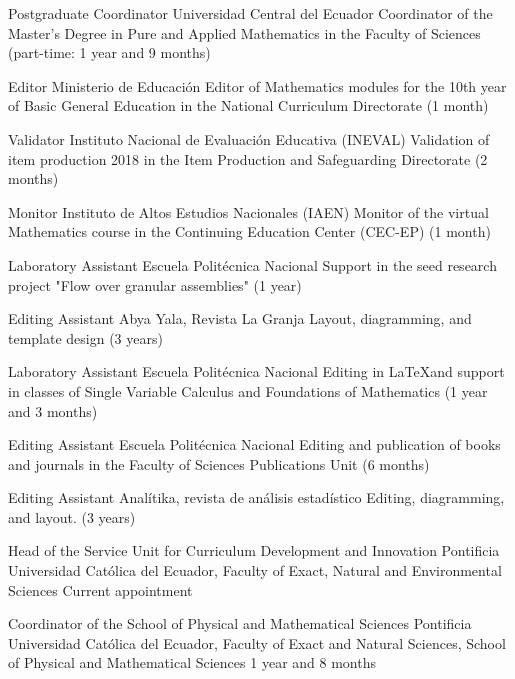 \documentclass[
    a4paper,
    maincolor=cvblue!70!blue,
    sidecolor=gray!30,
    sectioncolor=cvblue!70!blue,
    sidebarwidth=7.5cm,
    topbottommargin=20pt,
    leftrightmargin=20pt,
]{fortysecondscv}
\begin{document}

    {Postgraduate Coordinator}
    {Universidad Central del Ecuador}
    {Coordinator of the Master's Degree in Pure and Applied Mathematics in the Faculty of Sciences (part-time: 1 year and 9 months)}

    {Editor}
    {Ministerio de Educación}
    {Editor of Mathematics modules for the 10th year of Basic General Education in the National Curriculum Directorate (1 month)}

    {Validator}
    {Instituto Nacional de Evaluación Educativa (INEVAL)}
    {Validation of item production 2018 in the Item Production and Safeguarding Directorate (2 months)}

    {Monitor}
    {Instituto de Altos Estudios Nacionales (IAEN)}
    {Monitor of the virtual Mathematics course in the Continuing Education Center (CEC-EP) (1 month)}

    {Laboratory Assistant}
    {Escuela Politécnica Nacional}
    {Support in the seed research project "Flow over granular assemblies" (1 year)}

    {Editing Assistant}
    {Abya Yala, Revista La Granja}
    {Layout, diagramming, and template design (3 years)}

    {Laboratory Assistant}
    {Escuela Politécnica Nacional}
    {Editing in \LaTeX and support in classes of Single Variable Calculus and Foundations of Mathematics (1 year and 3 months)}

    {Editing Assistant}
    {Escuela Politécnica Nacional}
    {Editing and publication of books and journals in the Faculty of Sciences Publications Unit (6 months)}

    {Editing Assistant}
    {Analítika, revista de análisis estadístico}
    {Editing, diagramming, and layout. (3 years)}


\makebacksidebar


    {Head of the Service Unit for Curriculum Development and Innovation}
    {Pontificia Universidad Católica del Ecuador, Faculty of Exact, Natural and Environmental Sciences}
    {Current appointment}

    {Coordinator of the School of Physical and Mathematical Sciences}
    {Pontificia Universidad Católica del Ecuador, Faculty of Exact and Natural Sciences, School of Physical and Mathematical Sciences}
    {1 year and 8 months}
    
\end{document}
